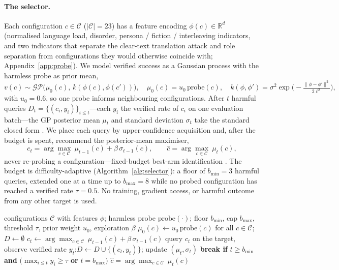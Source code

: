 \documentclass{article}
\begin{document}
\paragraph{The selector.} Each configuration $c\in\mathcal{C}$ ($|\mathcal{C}|{=}23$) has a feature
encoding $\phi(c)\in\mathbb{R}^{d}$ (normalised language load, disorder, persona / fiction /
interleaving indicators, and two indicators that separate the clear-text translation attack and role
separation from configurations they would otherwise coincide with; Appendix~\ref{app:probe}). We
model verified success as a Gaussian process with the harmless probe as prior mean,
\begin{equation}
v(c)\sim\mathcal{GP}\!\big(\mu_0(c),\,k(\phi(c),\phi(c'))\big),\quad
\mu_0(c)=u_0\,\mathrm{probe}(c),\quad
k(\phi,\phi')=\sigma^2\exp\!\Big(\!-\tfrac{\lVert\phi-\phi'\rVert^2}{2\ell^2}\Big),
\label{eq:gp}
\end{equation}
with $u_0{=}0.6$, so one probe informs neighbouring configurations. After $t$ harmful queries
$D_t=\{(c_i,y_i)\}_{i\le t}$---each $y_i$ the verified rate of $c_i$ on one evaluation batch---the GP
posterior mean $\mu_t$ and standard deviation $\sigma_t$ take the standard closed form
\citep{srinivas2010gpucb}. We place each query by upper-confidence acquisition and, after the budget
is spent, recommend the posterior-mean maximiser,
\begin{equation}
c_t=\arg\max_{c\in\mathcal{C}}\ \mu_{t-1}(c)+\beta\,\sigma_{t-1}(c),
\qquad
\hat c=\arg\max_{c\in\mathcal{C}}\ \mu_{t}(c),
\label{eq:acq}
\end{equation}
never re-probing a configuration---fixed-budget best-arm identification \citep{audibert2010bestarm}.
The budget is difficulty-adaptive (Algorithm~\ref{alg:selector}): a floor of $b_{\min}{=}3$ harmful
queries, extended one at a time up to $b_{\max}{=}8$ while no probed configuration has reached a
verified rate $\tau{=}0.5$. No training, gradient access, or harmful outcome from any other target is
used.

\begin{algorithm}[t]
\caption{Plaintext-warm-started GP best-arm selection for one target.}
\label{alg:selector}
\begin{algorithmic}[1]
\Require configurations $\mathcal{C}$ with features $\phi$; harmless probe $\mathrm{probe}(\cdot)$;
floor $b_{\min}$, cap $b_{\max}$, threshold $\tau$, prior weight $u_0$, exploration $\beta$
\State $\mu_0(c)\gets u_0\,\mathrm{probe}(c)$ for all $c\in\mathcal{C}$;\quad $D\gets\emptyset$
  \State $c_t\gets\arg\max_{c\in\mathcal{C}}\ \mu_{t-1}(c)+\beta\,\sigma_{t-1}(c)$
  \State query $c_t$ on the target, observe verified rate $y_t$;\quad $D\gets D\cup\{(c_t,y_t)\}$;
         update $(\mu_t,\sigma_t)$
  \State \textbf{break if} $t\ge b_{\min}$ \textbf{and} $\big(\max_{i\le t}y_i\ge\tau$ \textbf{or} $t=b_{\max}\big)$
\EndFor
\State \Return $\hat c=\arg\max_{c\in\mathcal{C}}\ \mu_t(c)$
\end{algorithmic}
\end{algorithm}
\end{document}
